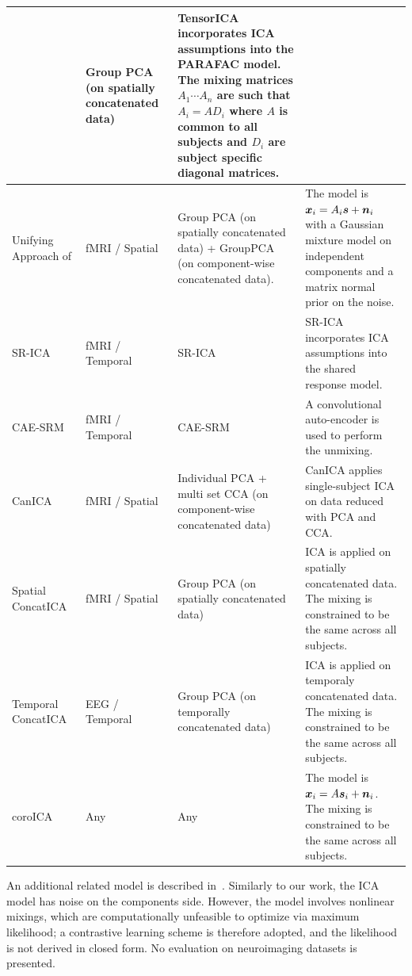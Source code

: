 \begin{center}
\begin{longtable}{ |p{} | p{} |p{}| p{}|}
&
Group PCA (on spatially concatenated data)
&
TensorICA incorporates ICA assumptions into the PARAFAC model. The mixing matrices $A_1 \cdots A_n$ are such that $A_i = A D_i$ where $A$ is common to all subjects and $D_i$ are subject specific diagonal matrices.\\  
\hline
Unifying Approach of \cite{guo2008unified} &
fMRI / Spatial
&
Group PCA (on spatially concatenated data) + GroupPCA (on component-wise concatenated data).
&
The model is $\boldsymbol{x}_i = A_i\boldsymbol{s} + \boldsymbol{n}_i$ with a Gaussian mixture model on independent components and a matrix normal prior on the noise. \\
\hline
SR-ICA \cite{zhang2016searchlight} &
fMRI / Temporal
&
SR-ICA
&
SR-ICA incorporates ICA assumptions into the shared response model.  \\
\hline
CAE-SRM \cite{chen2016convolutional}
&
fMRI / Temporal
&
CAE-SRM
&
A convolutional auto-encoder is used to perform the unmixing. \\  
\hline
CanICA \cite{varoquaux2009canica} &
fMRI / Spatial
&
Individual PCA + multi set CCA (on component-wise concatenated data)
&
CanICA applies single-subject ICA on data reduced with PCA and CCA.
 \\  
\hline
Spatial ConcatICA~\cite{svensen2002ica} &
fMRI / Spatial
&
Group PCA (on spatially concatenated data)
&
ICA is applied on spatially concatenated data. The mixing is constrained to be the same across all subjects.
 \\  
 \hline
Temporal ConcatICA~\cite{cong2013validating} &
EEG / Temporal
&
Group PCA (on temporally concatenated data)
&
ICA is applied on temporaly concatenated data. The mixing is constrained to be the same across all subjects.
 \\  
\hline
coroICA \cite{pfister2019robustifying} &
Any
&
Any
&
The model is  $\boldsymbol{x}_i = A\boldsymbol{s}_i + \boldsymbol{n}_i$. The mixing is constrained to be the same across all subjects. \\
\hline
\end{longtable}
\end{center}
An additional related model is described in~\cite{gresele2019incomplete}. Similarly to our work, the ICA model has noise on the components side. However, the model involves nonlinear mixings, which are computationally unfeasible to optimize via maximum likelihood; a contrastive learning scheme is therefore adopted, and the likelihood is not derived in closed form. No evaluation on neuroimaging datasets is presented.

